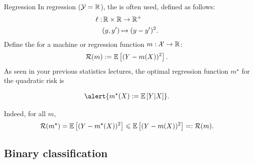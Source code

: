 \documentclass[xcolor={usenames,dvipsnames},handout]{beamer}
\begin{document}
\begin{frame}{Regression}
In regression (${\mathcal{Y}} = \mathbb{R}$), the  is often used, defined as follows:
\begin{align*}
\ell :  & \, \mathbb{R} \times \mathbb{R} \to \mathbb{R}^+ \\
& (y,y') \mapsto (y-y')^2.
\end{align*}
Define the  for a machine or regression function $m :{\mathcal{X}} \to \mathbb{R}$:
\begin{align*}
{\mathcal{R}}(m) := \mathbb{E} \left[ (Y-m(X) )^2 \right].
\end{align*}
As seen in your previous statistics lectures, the optimal regression function $m^\star$ for the quadratic risk is 

\begin{align*}
\alert{m^\star(X) := \E \left[ Y | X \right]}.
\end{align*}

Indeed, for all $m$,
$$
{\mathcal{R}}(m^\star) = \mathbb{E} \left[ (Y-m^\star(X) )^2 \right] \leqslant \mathbb{E} \left[ (Y-m(X) )^2 \right] =: {\mathcal{R}}(m).
$$
\end{frame}

%
%



\subsection{Binary classification}
\end{document}
